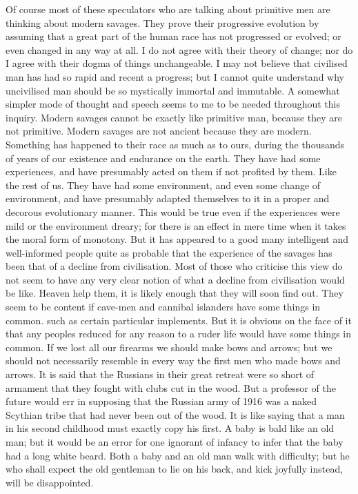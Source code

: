 Of course most of these speculators who are talking about primitive men are thinking about modern savages. They prove their progressive evolution by assuming that a great part of the human race has not progressed or evolved; or even changed in any way at all. I do not agree with their theory of change; nor do I agree with their dogma of things unchangeable. I may not believe that civilised man has had so rapid and recent a progress; but I cannot quite understand why uncivilised man should be so mystically immortal and immutable. A somewhat simpler mode of thought and speech seems to me to be needed throughout this inquiry. Modern savages cannot be exactly like primitive man, because they are not primitive. Modern savages are not ancient because they are modern. Something has happened to their race as much as to ours, during the thousands of years of our existence and endurance on the earth. They have had some experiences, and have presumably acted on them if not profited by them. Like the rest of us. They have had some environment, and even some change of environment, and have presumably adapted themselves to it in a proper and decorous evolutionary manner. This would be true even if the experiences were mild or the environment dreary; for there is an effect in mere time when it takes the moral form of monotony. But it has appeared to a good many intelligent and well-informed people quite as probable that the experience of the savages has been that of a decline from civilisation. Most of those who criticise this view do not seem to have any very clear notion of what a decline from civilisation would be like. Heaven help them, it is likely enough that they will soon find out. They seem to be content if cave-men and cannibal islanders have some things in common. such as certain particular implements. But it is obvious on the face of it that any peoples reduced for any reason to a ruder life would have some things in common. If we lost all our firearms we should make bows and arrows; but we should not necessarily resemble in every way the first men who made bows and arrows. It is said that the Russians in their great retreat were so short of armament that they fought with clubs cut in the wood. But a professor of the future would err in supposing that the Russian army of 1916 was a naked Scythian tribe that had never been out of the wood. It is like saying that a man in his second childhood must exactly copy his first. A baby is bald like an old man; but it would be an error for one ignorant of infancy to infer that the baby had a long white beard. Both a baby and an old man walk with difficulty; but he who shall expect the old gentleman to lie on his back, and kick joyfully instead, will be disappointed.

